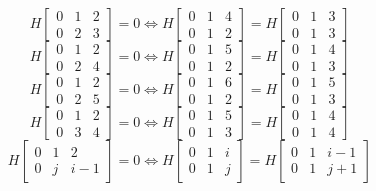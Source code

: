 $$ H\left[\begin{matrix}0 & 1 & 2\\0 & 2 & 3\end{matrix}\right] = 0 \Leftrightarrow H\left[\begin{matrix}0 & 1 & 4\\0 & 1 & 2\end{matrix}\right] = H\left[\begin{matrix}0 & 1 & 3\\0 & 1 & 3\end{matrix}\right] $$
$$ H\left[\begin{matrix}0 & 1 & 2\\0 & 2 & 4\end{matrix}\right] = 0 \Leftrightarrow H\left[\begin{matrix}0 & 1 & 5\\0 & 1 & 2\end{matrix}\right] = H\left[\begin{matrix}0 & 1 & 4\\0 & 1 & 3\end{matrix}\right] $$
$$ H\left[\begin{matrix}0 & 1 & 2\\0 & 2 & 5\end{matrix}\right] = 0 \Leftrightarrow H\left[\begin{matrix}0 & 1 & 6\\0 & 1 & 2\end{matrix}\right] = H\left[\begin{matrix}0 & 1 & 5\\0 & 1 & 3\end{matrix}\right] $$
$$ H\left[\begin{matrix}0 & 1 & 2\\0 & 3 & 4\end{matrix}\right] = 0 \Leftrightarrow H\left[\begin{matrix}0 & 1 & 5\\0 & 1 & 3\end{matrix}\right] = H\left[\begin{matrix}0 & 1 & 4\\0 & 1 & 4\end{matrix}\right] $$
$$ H\left[\begin{matrix}0 & 1 & 2\\0 & j & i - 1\end{matrix}\right] = 0 \Leftrightarrow H\left[\begin{matrix}0 & 1 & i\\0 & 1 & j\end{matrix}\right] = H\left[\begin{matrix}0 & 1 & i - 1\\0 & 1 & j + 1\end{matrix}\right] $$
